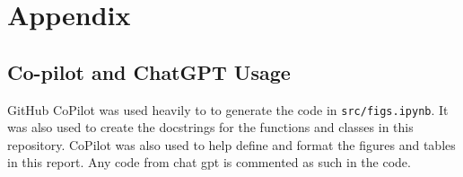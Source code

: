\documentclass[11pt]{article}
\begin{document}
\section{Appendix}
\subsection{Co-pilot and ChatGPT Usage}
GitHub CoPilot was used heavily to to generate the code in \texttt{src/figs.ipynb}. It was also used to create the docstrings for the functions and classes in this repository. CoPilot was also used to help define and format the figures and tables in this report. Any code from chat gpt is commented as such in the code.

\end{document}
